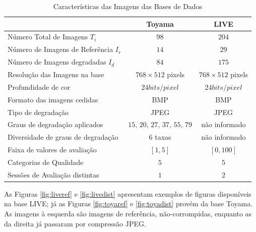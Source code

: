 \begin{table}[htb]
	\footnotesize
	\caption[Características das Imagens das Bases de Dados]{Características das Imagens das Bases de Dados}
	\label{tab:bds}
	\centering
 	\begin{tabular}{ l | c | c } %
							&	\textbf{Toyama}			&	\textbf{LIVE} 		\\\hline %
		Número Total de Imagens	$T_i$		&	$98$				&	$204$	  		\\ %
		Número de Imagens de Referência $I_r$	& 	$14$				&	$29$		  	\\
		Número de Imagens degradadas $I_d$	&	$84$				&	$175$	  		\\
		Resolução das Imagens na base		& 	$768 \times 512$ pixels 	&	$768 \times 512$ pixels	\\
		Profundidade de cor			&	$24bits/pixel$			&	$24bits/pixel$ 		\\
		Formato das imagens cedidas		&	BMP				&	BMP		  	\\
		Tipo de degradação			&	JPEG				&	JPEG		  	\\
		Graus de degradação aplicados		& $15$, $20$, $27$, $37$, $55$, $79$ 	& 	não informado 		\\
		Diversidade de graus de degradação	&	$6$ taxas			&  	não informado 		\\
		Faixa de valores de avaliação		& 	$[1, 5]$			& 	$[0, 100]$		\\
		Categorias de Qualidade			&	$5$				& 	$5$			\\
		Sessões de Avaliação distintas		&	$1$				& 	$2$			\\
		
	\end {tabular}\par
\end{table}

As Figuras \ref*{fig:liveref} e \ref*{fig:livedist} apresentam exemplos de figuras disponíveis na base LIVE; já as Figuras \ref{fig:toyaref} e \ref{fig:toyadist} provém da base Toyama. As imagens à esquerda são imagens de referência, não-corrompidas, enquanto as da direita já passaram por compressão JPEG.


